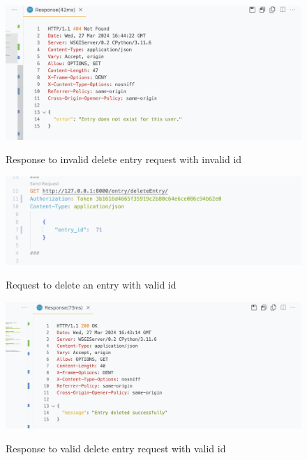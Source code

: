 \begin{figure}[H]
    \caption{Response to invalid delete entry request with invalid id}
    \includegraphics[width=\textwidth]{Assets/api_test/response_delete_entry_invalid.png}
    \label{fig:response_delete_entry_invalid}
\end{figure}

\begin{figure}[H]
    \caption{Request to delete an entry with valid id}
    \includegraphics[width=\textwidth]{Assets/api_test/request_delete_entry_valid.png}
    \label{fig:request_delete_entry_valid}
\end{figure}

\begin{figure}[H]
    \caption{Response to valid delete entry request with valid id}
    \includegraphics[width=\textwidth]{Assets/api_test/response_delete_entry_valid.png}
    \label{fig:response_delete_entry_valid}
\end{figure}

